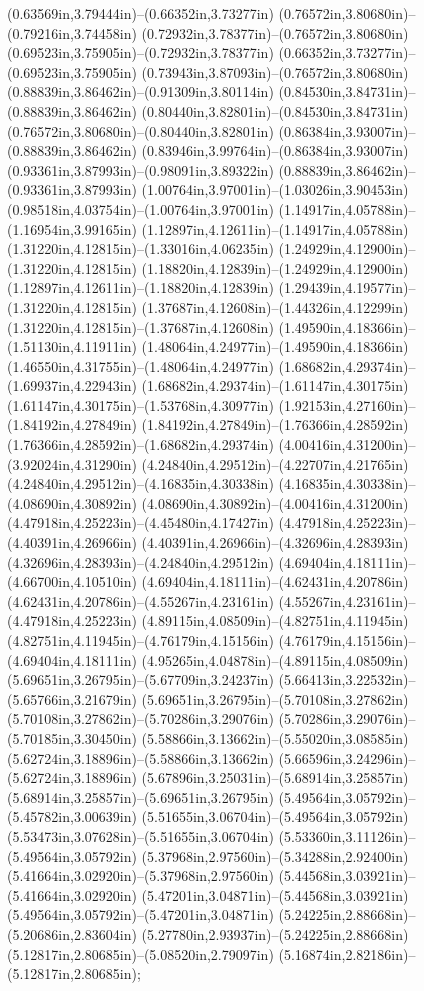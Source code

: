 (0.63569in,3.79444in)--(0.66352in,3.73277in) (0.76572in,3.80680in)--(0.79216in,3.74458in) (0.72932in,3.78377in)--(0.76572in,3.80680in) (0.69523in,3.75905in)--(0.72932in,3.78377in) (0.66352in,3.73277in)--(0.69523in,3.75905in) (0.73943in,3.87093in)--(0.76572in,3.80680in) (0.88839in,3.86462in)--(0.91309in,3.80114in) (0.84530in,3.84731in)--(0.88839in,3.86462in) (0.80440in,3.82801in)--(0.84530in,3.84731in) (0.76572in,3.80680in)--(0.80440in,3.82801in) (0.86384in,3.93007in)--(0.88839in,3.86462in) (0.83946in,3.99764in)--(0.86384in,3.93007in) (0.93361in,3.87993in)--(0.98091in,3.89322in) (0.88839in,3.86462in)--(0.93361in,3.87993in) (1.00764in,3.97001in)--(1.03026in,3.90453in) (0.98518in,4.03754in)--(1.00764in,3.97001in) (1.14917in,4.05788in)--(1.16954in,3.99165in) (1.12897in,4.12611in)--(1.14917in,4.05788in) (1.31220in,4.12815in)--(1.33016in,4.06235in) (1.24929in,4.12900in)--(1.31220in,4.12815in) (1.18820in,4.12839in)--(1.24929in,4.12900in) (1.12897in,4.12611in)--(1.18820in,4.12839in) (1.29439in,4.19577in)--(1.31220in,4.12815in) (1.37687in,4.12608in)--(1.44326in,4.12299in) (1.31220in,4.12815in)--(1.37687in,4.12608in) (1.49590in,4.18366in)--(1.51130in,4.11911in) (1.48064in,4.24977in)--(1.49590in,4.18366in) (1.46550in,4.31755in)--(1.48064in,4.24977in) (1.68682in,4.29374in)--(1.69937in,4.22943in) (1.68682in,4.29374in)--(1.61147in,4.30175in) (1.61147in,4.30175in)--(1.53768in,4.30977in) (1.92153in,4.27160in)--(1.84192in,4.27849in) (1.84192in,4.27849in)--(1.76366in,4.28592in) (1.76366in,4.28592in)--(1.68682in,4.29374in) (4.00416in,4.31200in)--(3.92024in,4.31290in) (4.24840in,4.29512in)--(4.22707in,4.21765in) (4.24840in,4.29512in)--(4.16835in,4.30338in) (4.16835in,4.30338in)--(4.08690in,4.30892in) (4.08690in,4.30892in)--(4.00416in,4.31200in) (4.47918in,4.25223in)--(4.45480in,4.17427in) (4.47918in,4.25223in)--(4.40391in,4.26966in) (4.40391in,4.26966in)--(4.32696in,4.28393in) (4.32696in,4.28393in)--(4.24840in,4.29512in) (4.69404in,4.18111in)--(4.66700in,4.10510in) (4.69404in,4.18111in)--(4.62431in,4.20786in) (4.62431in,4.20786in)--(4.55267in,4.23161in) (4.55267in,4.23161in)--(4.47918in,4.25223in) (4.89115in,4.08509in)--(4.82751in,4.11945in) (4.82751in,4.11945in)--(4.76179in,4.15156in) (4.76179in,4.15156in)--(4.69404in,4.18111in) (4.95265in,4.04878in)--(4.89115in,4.08509in) (5.69651in,3.26795in)--(5.67709in,3.24237in) (5.66413in,3.22532in)--(5.65766in,3.21679in) (5.69651in,3.26795in)--(5.70108in,3.27862in) (5.70108in,3.27862in)--(5.70286in,3.29076in) (5.70286in,3.29076in)--(5.70185in,3.30450in) (5.58866in,3.13662in)--(5.55020in,3.08585in) (5.62724in,3.18896in)--(5.58866in,3.13662in) (5.66596in,3.24296in)--(5.62724in,3.18896in) (5.67896in,3.25031in)--(5.68914in,3.25857in) (5.68914in,3.25857in)--(5.69651in,3.26795in) (5.49564in,3.05792in)--(5.45782in,3.00639in) (5.51655in,3.06704in)--(5.49564in,3.05792in) (5.53473in,3.07628in)--(5.51655in,3.06704in) (5.53360in,3.11126in)--(5.49564in,3.05792in) (5.37968in,2.97560in)--(5.34288in,2.92400in) (5.41664in,3.02920in)--(5.37968in,2.97560in) (5.44568in,3.03921in)--(5.41664in,3.02920in) (5.47201in,3.04871in)--(5.44568in,3.03921in) (5.49564in,3.05792in)--(5.47201in,3.04871in) (5.24225in,2.88668in)--(5.20686in,2.83604in) (5.27780in,2.93937in)--(5.24225in,2.88668in) (5.12817in,2.80685in)--(5.08520in,2.79097in) (5.16874in,2.82186in)--(5.12817in,2.80685in);
